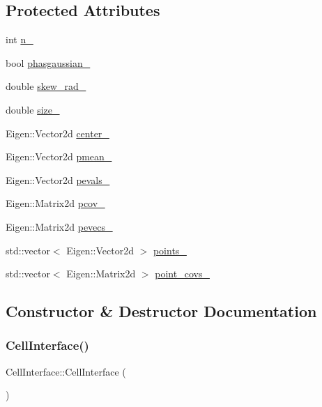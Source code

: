 \subsection*{Protected Attributes}
\begin{DoxyCompactItemize}
\item 
int \hyperlink{classCellInterface_a779f8e1459ebe2a33215b6931ae6c165}{n\+\_\+}
\item 
bool \hyperlink{classCellInterface_a15dded52d2271347ef711b81575bde1e}{phasgaussian\+\_\+}
\item 
double \hyperlink{classCellInterface_a5de34cbe7e4988e4f46560ee234f6e8c}{skew\+\_\+rad\+\_\+}
\item 
double \hyperlink{classCellInterface_a02bccbc4587ef6fd1a31c03a464676c4}{size\+\_\+}
\item 
Eigen\+::\+Vector2d \hyperlink{classCellInterface_ab7d0bf5e6519c77f07a249387c8be576}{center\+\_\+}
\item 
Eigen\+::\+Vector2d \hyperlink{classCellInterface_ae597d408c22886e04f371dff9a023828}{pmean\+\_\+}
\item 
Eigen\+::\+Vector2d \hyperlink{classCellInterface_abe2d8e173c39dbed8eb23d111837fa57}{pevals\+\_\+}
\item 
Eigen\+::\+Matrix2d \hyperlink{classCellInterface_ae940f0f4946d6dad966f13d89a447182}{pcov\+\_\+}
\item 
Eigen\+::\+Matrix2d \hyperlink{classCellInterface_adb945c67c87d8255a3a6b8c9c30d4c92}{pevecs\+\_\+}
\item 
std\+::vector$<$ Eigen\+::\+Vector2d $>$ \hyperlink{classCellInterface_a3a869f0534662265a9733df1968c820c}{points\+\_\+}
\item 
std\+::vector$<$ Eigen\+::\+Matrix2d $>$ \hyperlink{classCellInterface_ae60338a437c045b757f7586a8a696409}{point\+\_\+covs\+\_\+}
\end{DoxyCompactItemize}


\subsection{Constructor \& Destructor Documentation}
\mbox{\label{classCellInterface_a9b6475eb2be5f4d13eec0f5057e6318a}} 
\subsubsection{\texorpdfstring{Cell\+Interface()}{CellInterface()}}
{\footnotesize\ttfamily Cell\+Interface\+::\+Cell\+Interface (\begin{DoxyParamCaption}{ }\end{DoxyParamCaption})\hspace{0.3cm}{\ttfamily [inline]}}



